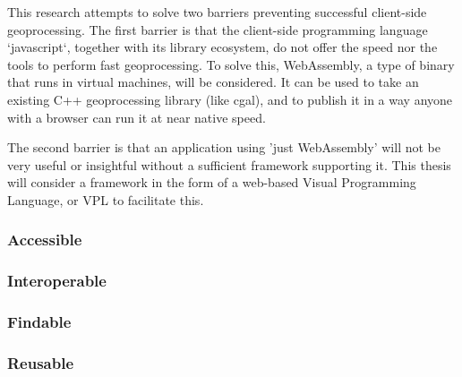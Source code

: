 This research attempts to solve two barriers preventing successful client-side geoprocessing. The first barrier is that the client-side programming language `javascript`, together with its library ecosystem, do not offer the speed nor the tools to perform fast geoprocessing. To solve this, WebAssembly, a type of binary that runs in virtual machines, will be considered. It can be used to take an existing C++ geoprocessing library (like cgal), and to publish it in a way anyone with a browser can run it at near native speed. 

The second barrier is that an application using 'just WebAssembly' will not be very useful or insightful without a sufficient framework supporting it. This thesis will consider a framework in the form of a web-based Visual Programming Language, or VPL to facilitate this. 



\subsubsection*{Accessible}


\subsubsection*{Interoperable}



\subsubsection*{Findable}


\subsubsection*{Reusable}


